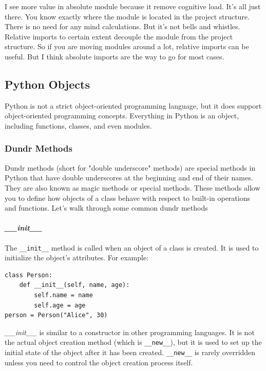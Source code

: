I see more value in absolute module because it remove cognitive load. It's all just there. You know exactly where the module is located in the project structure. There is no need for any mind calculations. But it's not bells and whistles. Relative imports to certain extent decouple the module from the project structure. So if you are moving modules around a lot, relative imports can be useful. But I think absolute imports are the way to go for most cases.


\subsection{Python Objects}
Python is not a strict object-oriented programming language, but it does support object-oriented programming concepts. Everything in Python is an object, including functions, classes, and even modules.

\subsubsection{Dundr Methods}
Dundr methods (short for "double underscore" methods) are special methods in Python that have double underscores at the beginning and end of their names. They are also known as magic methods or special methods. These methods allow you to define how objects of a class behave with respect to built-in operations and functions. Let's walk through some common dundr methods

\paragraph{\textit{\_\_init\_\_}}
The \texttt{\_\_init\_\_} method is called when an object of a class is created. It is used to initialize the object's attributes. For example:
\begin{lstlisting}[caption=\texttt{\_\_init\_\_} Example]
class Person:
    def __init__(self, name, age):
        self.name = name
        self.age = age
person = Person("Alice", 30)
\end{lstlisting}
\noindent\makebox[\linewidth]{\rule{\paperwidth}{0.4pt}}
\textit{\_\_init\_\_} is similar to a constructor in other programming languages. It is not the actual object creation method (which is \texttt{\_\_new\_\_}), but it is used to set up the initial state of the object after it has been created. \texttt{\_\_new\_\_} is rarely overridden unless you need to control the object creation process itself.


